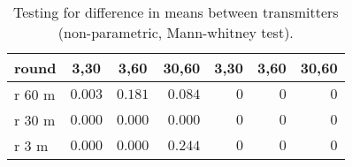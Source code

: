 %
\begin{table}[!tbp]
\caption{Testing for difference in means between transmitters (non-parametric, Mann-whitney test).\label{tab:pvals2}} 
\begin{center}
\begin{tabular}{lrrrrrr}
\hline\hline
\multicolumn{1}{l}{round}&\multicolumn{1}{c}{3,30}&\multicolumn{1}{c}{3,60}&\multicolumn{1}{c}{30,60}&\multicolumn{1}{c}{3,30}&\multicolumn{1}{c}{3,60}&\multicolumn{1}{c}{30,60}\tabularnewline
\hline
r 60 m&$0.003$&$0.181$&$0.084$&$0$&$0$&$0$\tabularnewline
r 30 m&$0.000$&$0.000$&$0.000$&$0$&$0$&$0$\tabularnewline
r 3 m&$0.000$&$0.000$&$0.244$&$0$&$0$&$0$\tabularnewline
\hline
\end{tabular}
\end{center}
\end{table}

